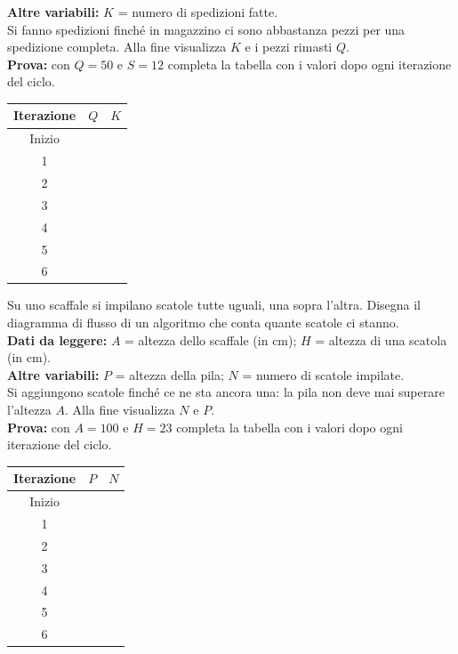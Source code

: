 \begin{esercizio}[14]
{\textbf{Altre variabili:} $K$ = numero di spedizioni fatte.\\
Si fanno spedizioni finché in magazzino ci sono abbastanza pezzi per una spedizione completa.
Alla fine visualizza $K$ e i pezzi rimasti $Q$.\\
\textbf{Prova:} con $Q = 50$ e $S = 12$ completa la tabella con i valori dopo ogni iterazione del ciclo.
\begin{center}\renewcommand{\arraystretch}{1.25}
\begin{tabular}{|c|p{3cm}|p{3cm}|}\hline
  Iterazione & $Q$ & $K$\\\hline
  Inizio & &\\\hline
  1 & &\\\hline
  2 & &\\\hline
  3 & &\\\hline
  4 & &\\\hline
  5 & &\\\hline
  6 & &\\\hline
\end{tabular}\end{center}}{%
Su uno scaffale si impilano scatole tutte uguali, una sopra l'altra. Disegna il diagramma di
flusso di un algoritmo che conta quante scatole ci stanno.\\
\textbf{Dati da leggere:} $A$ = altezza dello scaffale (in cm); $H$ = altezza di una scatola (in cm).\\
\textbf{Altre variabili:} $P$ = altezza della pila; $N$ = numero di scatole impilate.\\
Si aggiungono scatole finché ce ne sta ancora una: la pila non deve mai superare l'altezza $A$.
Alla fine visualizza $N$ e $P$.\\
\textbf{Prova:} con $A = 100$ e $H = 23$ completa la tabella con i valori dopo ogni iterazione del ciclo.
\begin{center}\renewcommand{\arraystretch}{1.25}
\begin{tabular}{|c|p{3cm}|p{3cm}|}\hline
  Iterazione & $P$ & $N$\\\hline
  Inizio & &\\\hline
  1 & &\\\hline
  2 & &\\\hline
  3 & &\\\hline
  4 & &\\\hline
  5 & &\\\hline
  6 & &\\\hline
\end{tabular}\end{center}}


\end{esercizio}
